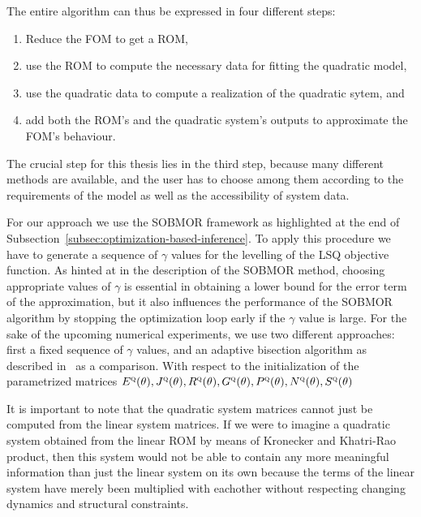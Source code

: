 The entire algorithm can thus be expressed in four different steps:
\begin{enumerate}
    \item Reduce the \ac{FOM} to get a \ac{ROM},
    \item use the \ac{ROM} to compute the necessary data for fitting the quadratic model,
    \item use the quadratic data to compute a realization of the quadratic sytem, and
    \item add both the \ac{ROM}'s and the quadratic system's outputs to approximate the \ac{FOM}'s behaviour.
\end{enumerate}
The crucial step for this thesis lies in the third step, because many different methods are available, and the user has to choose among them according to the requirements of the model as well as the accessibility of system data.


For our approach we use the \ac{SOBMOR} framework as highlighted at the end of Subsection~\ref{subsec:optimization-based-inference}.
To apply this procedure we have to generate a sequence of $\gamma$ values for the levelling of the \ac{LSQ} objective function.
As hinted at in the description of the \ac{SOBMOR} method, choosing appropriate values of $\gamma$ is essential in obtaining a lower bound for the error term of the approximation, but it also influences the performance of the \ac{SOBMOR} algorithm by stopping the optimization loop early if the $\gamma$ value is large.
For the sake of the upcoming numerical experiments, we use two different approaches: first a fixed sequence of $\gamma$ values, and an adaptive bisection algorithm as described in~\cite{SV2021} as a comparison.
With respect to the initialization of the parametrized matrices $E^{\textnormal{\scshape q}}(\theta), J^{\textnormal{\scshape q}}(\theta), R^{\textnormal{\scshape q}}(\theta), G^{\textnormal{\scshape q}}(\theta), P^{\textnormal{\scshape q}}(\theta), N^{\textnormal{\scshape q}}(\theta), S^{\textnormal{\scshape q}}(\theta)$



It is important to note that the quadratic system matrices cannot just be computed from the linear system matrices.
If we were to imagine a quadratic system obtained from the linear \ac{ROM} by means of Kronecker and Khatri-Rao product, then this system would not be able to contain any more meaningful information than just the linear system on its own because the terms of the linear system have merely been multiplied with eachother without respecting changing dynamics and structural constraints.


